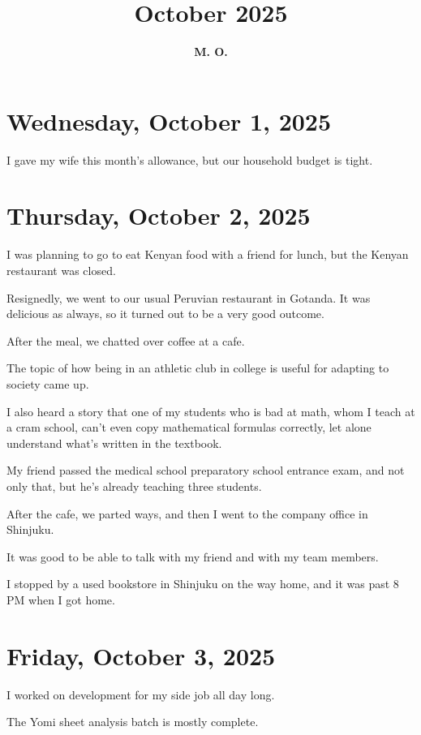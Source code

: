 \documentclass[uplatex]{jsarticle}
\title{
\textbf{October 2025}
}
\author{
\textbf{M. O.}
}
\begin{document}
\maketitle

\section{Wednesday, October 1, 2025}

I gave my wife this month's allowance, but our household budget is tight.



\section{Thursday, October 2, 2025}

I was planning to go to eat Kenyan food with a friend for lunch, but the Kenyan restaurant was closed.

Resignedly, we went to our usual Peruvian restaurant in Gotanda. It was delicious as always, so it turned out to be a very good outcome.

After the meal, we chatted over coffee at a cafe.

The topic of how being in an athletic club in college is useful for adapting to society came up.

I also heard a story that one of my students who is bad at math, whom I teach at a cram school, can't even copy mathematical formulas correctly, let alone understand what's written in the textbook.

My friend passed the medical school preparatory school entrance exam, and not only that, but he's already teaching three students.

After the cafe, we parted ways, and then I went to the company office in Shinjuku.

It was good to be able to talk with my friend and with my team members.

I stopped by a used bookstore in Shinjuku on the way home, and it was past 8 PM when I got home.



\section{Friday, October 3, 2025}

I worked on development for my side job all day long.

The Yomi sheet analysis batch is mostly complete.
\end{document}
